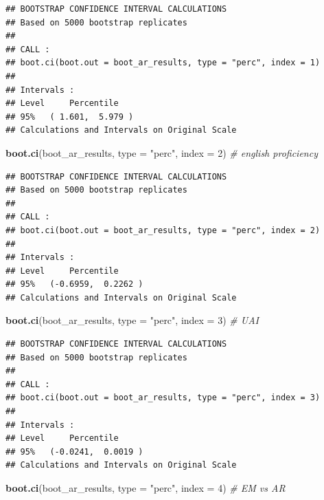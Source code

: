 \documentclass[
]{article}
\newenvironment{Shaded}{\begin{snugshade}}{\end{snugshade}}
\newcommand{\AttributeTok}[1]{\textcolor[rgb]{0.13,0.29,0.53}{#1}}
\newcommand{\CommentTok}[1]{\textcolor[rgb]{0.56,0.35,0.01}{\textit{#1}}}
\newcommand{\DecValTok}[1]{\textcolor[rgb]{0.00,0.00,0.81}{#1}}
\newcommand{\FunctionTok}[1]{\textcolor[rgb]{0.13,0.29,0.53}{\textbf{#1}}}
\newcommand{\NormalTok}[1]{#1}
\newcommand{\StringTok}[1]{\textcolor[rgb]{0.31,0.60,0.02}{#1}}
\begin{document}
\begin{verbatim}
## BOOTSTRAP CONFIDENCE INTERVAL CALCULATIONS
## Based on 5000 bootstrap replicates
## 
## CALL : 
## boot.ci(boot.out = boot_ar_results, type = "perc", index = 1)
## 
## Intervals : 
## Level     Percentile     
## 95%   ( 1.601,  5.979 )  
## Calculations and Intervals on Original Scale
\end{verbatim}

\begin{Shaded}
\begin{Highlighting}[]
\FunctionTok{boot.ci}\NormalTok{(boot\_ar\_results, }\AttributeTok{type =} \StringTok{"perc"}\NormalTok{, }\AttributeTok{index =} \DecValTok{2}\NormalTok{) }\CommentTok{\# english proficiency}
\end{Highlighting}
\end{Shaded}

\begin{verbatim}
## BOOTSTRAP CONFIDENCE INTERVAL CALCULATIONS
## Based on 5000 bootstrap replicates
## 
## CALL : 
## boot.ci(boot.out = boot_ar_results, type = "perc", index = 2)
## 
## Intervals : 
## Level     Percentile     
## 95%   (-0.6959,  0.2262 )  
## Calculations and Intervals on Original Scale
\end{verbatim}

\begin{Shaded}
\begin{Highlighting}[]
\FunctionTok{boot.ci}\NormalTok{(boot\_ar\_results, }\AttributeTok{type =} \StringTok{"perc"}\NormalTok{, }\AttributeTok{index =} \DecValTok{3}\NormalTok{) }\CommentTok{\# UAI}
\end{Highlighting}
\end{Shaded}

\begin{verbatim}
## BOOTSTRAP CONFIDENCE INTERVAL CALCULATIONS
## Based on 5000 bootstrap replicates
## 
## CALL : 
## boot.ci(boot.out = boot_ar_results, type = "perc", index = 3)
## 
## Intervals : 
## Level     Percentile     
## 95%   (-0.0241,  0.0019 )  
## Calculations and Intervals on Original Scale
\end{verbatim}

\begin{Shaded}
\begin{Highlighting}[]
\FunctionTok{boot.ci}\NormalTok{(boot\_ar\_results, }\AttributeTok{type =} \StringTok{"perc"}\NormalTok{, }\AttributeTok{index =} \DecValTok{4}\NormalTok{) }\CommentTok{\# EM vs AR}
\end{Highlighting}
\end{Shaded}
\end{document}
